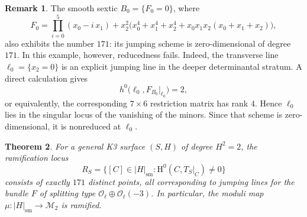 \documentclass[a4paper,12pt,twoside,reqno]{amsart}
\numberwithin{equation}{section}
\theoremstyle{plain}
\newtheorem{theorem}{Theorem}[section]
\theoremstyle{definition}
\newtheorem{remark}[theorem]{Remark}
\newcommand{\Oc}{\mathscr{O}}
\newcommand{\sm}{\mathrm{sm}}
\newcommand{\Mmod}{\mathscr{M}}
\newcommand{\HH}{\mathrm{H}}
\theoremstyle{plain}
\theoremstyle{definition}
\begin{document}
\begin{remark}\label{rem:nonreduced-example_h2}
The smooth sextic $B_0=\{F_0=0\}$, where
\[
 F_0=\prod_{i=0}^{5}(x_0-i\,x_1)
 +x_2^{2}\bigl(x_0^4+x_1^4+x_2^4
 +x_0x_1x_2(x_0+x_1+x_2)\bigr),
\]
also exhibits the number $171$: its jumping scheme is zero-dimensional of
degree $171$.  In this example, however, reducedness fails.  Indeed, the transverse line
$\ell_0=\{x_2=0\}$ is an explicit jumping line in the deeper determinantal stratum.
A direct calculation gives
\[
 h^0\bigl(\ell_0,F_{B_0}|_{\ell_0}\bigr)=2,
\]
or equivalently, the corresponding $7\times6$ restriction matrix has rank
$4$.  Hence $\ell_0$ lies in the singular locus of the vanishing of the minors.
Since that scheme is zero-dimensional, it is nonreduced at $\ell_0$.
\end{remark}

\begin{theorem}\label{thm:very-general_h2}
For a general K3 surface $(S,H)$ of degree $H^2=2$, the ramification locus 
\[ 
   R_S=\{[C]\in|H|_{\sm}:\HH^0(C,T_S|_C)\neq0\}
\] 
consists of exactly $171$ distinct points, all corresponding to jumping lines for the bundle $F$ of splitting type $\Oc_\ell\oplus\Oc_\ell(-3)$. In particular, the moduli map $\mu\colon|H|_{\sm}\to \Mmod_2$ is ramified.
\end{theorem}
\end{document}
